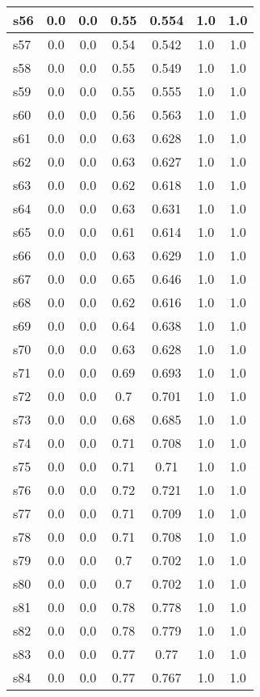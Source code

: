\documentclass{article}
\begin{document}
\begin{tabular}{|l|c|c|c|c|c|c|}
\hline
s56 &0.0 & 0.0 & 0.55 & 0.554 & 1.0 & 1.0\\
\hline
s57 &0.0 & 0.0 & 0.54 & 0.542 & 1.0 & 1.0\\
\hline
s58 &0.0 & 0.0 & 0.55 & 0.549 & 1.0 & 1.0\\
\hline
s59 &0.0 & 0.0 & 0.55 & 0.555 & 1.0 & 1.0\\
\hline
s60 &0.0 & 0.0 & 0.56 & 0.563 & 1.0 & 1.0\\
\hline
s61 &0.0 & 0.0 & 0.63 & 0.628 & 1.0 & 1.0\\
\hline
s62 &0.0 & 0.0 & 0.63 & 0.627 & 1.0 & 1.0\\
\hline
s63 &0.0 & 0.0 & 0.62 & 0.618 & 1.0 & 1.0\\
\hline
s64 &0.0 & 0.0 & 0.63 & 0.631 & 1.0 & 1.0\\
\hline
s65 &0.0 & 0.0 & 0.61 & 0.614 & 1.0 & 1.0\\
\hline
s66 &0.0 & 0.0 & 0.63 & 0.629 & 1.0 & 1.0\\
\hline
s67 &0.0 & 0.0 & 0.65 & 0.646 & 1.0 & 1.0\\
\hline
s68 &0.0 & 0.0 & 0.62 & 0.616 & 1.0 & 1.0\\
\hline
s69 &0.0 & 0.0 & 0.64 & 0.638 & 1.0 & 1.0\\
\hline
s70 &0.0 & 0.0 & 0.63 & 0.628 & 1.0 & 1.0\\
\hline
s71 &0.0 & 0.0 & 0.69 & 0.693 & 1.0 & 1.0\\
\hline
s72 &0.0 & 0.0 & 0.7 & 0.701 & 1.0 & 1.0\\
\hline
s73 &0.0 & 0.0 & 0.68 & 0.685 & 1.0 & 1.0\\
\hline
s74 &0.0 & 0.0 & 0.71 & 0.708 & 1.0 & 1.0\\
\hline
s75 &0.0 & 0.0 & 0.71 & 0.71 & 1.0 & 1.0\\
\hline
s76 &0.0 & 0.0 & 0.72 & 0.721 & 1.0 & 1.0\\
\hline
s77 &0.0 & 0.0 & 0.71 & 0.709 & 1.0 & 1.0\\
\hline
s78 &0.0 & 0.0 & 0.71 & 0.708 & 1.0 & 1.0\\
\hline
s79 &0.0 & 0.0 & 0.7 & 0.702 & 1.0 & 1.0\\
\hline
s80 &0.0 & 0.0 & 0.7 & 0.702 & 1.0 & 1.0\\
\hline
s81 &0.0 & 0.0 & 0.78 & 0.778 & 1.0 & 1.0\\
\hline
s82 &0.0 & 0.0 & 0.78 & 0.779 & 1.0 & 1.0\\
\hline
s83 &0.0 & 0.0 & 0.77 & 0.77 & 1.0 & 1.0\\
\hline
s84 &0.0 & 0.0 & 0.77 & 0.767 & 1.0 & 1.0\\

\end{tabular}
\end{document}

